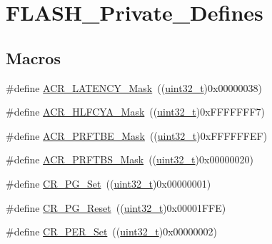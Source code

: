 \hypertarget{group___f_l_a_s_h___private___defines}{}\section{F\+L\+A\+S\+H\+\_\+\+Private\+\_\+\+Defines}
\label{group___f_l_a_s_h___private___defines}
\subsection*{Macros}
\begin{DoxyCompactItemize}
\item 
\#define \hyperlink{group___f_l_a_s_h___private___defines_ga5f1112c5731f01b063fdf2461efbedf7}{A\+C\+R\+\_\+\+L\+A\+T\+E\+N\+C\+Y\+\_\+\+Mask}~((\hyperlink{_p_e___types_8h_a33594304e786b158f3fb30289278f5af}{uint32\+\_\+t})0x00000038)
\item 
\#define \hyperlink{group___f_l_a_s_h___private___defines_ga6b6f73163f3a90f5072b6b7dc9fb63b7}{A\+C\+R\+\_\+\+H\+L\+F\+C\+Y\+A\+\_\+\+Mask}~((\hyperlink{_p_e___types_8h_a33594304e786b158f3fb30289278f5af}{uint32\+\_\+t})0x\+F\+F\+F\+F\+F\+F\+F7)
\item 
\#define \hyperlink{group___f_l_a_s_h___private___defines_gaf95fa450690ce94c4f4357e4dd72791a}{A\+C\+R\+\_\+\+P\+R\+F\+T\+B\+E\+\_\+\+Mask}~((\hyperlink{_p_e___types_8h_a33594304e786b158f3fb30289278f5af}{uint32\+\_\+t})0x\+F\+F\+F\+F\+F\+F\+E\+F)
\item 
\#define \hyperlink{group___f_l_a_s_h___private___defines_ga257768fe5d61ac49f43b6b90ba413102}{A\+C\+R\+\_\+\+P\+R\+F\+T\+B\+S\+\_\+\+Mask}~((\hyperlink{_p_e___types_8h_a33594304e786b158f3fb30289278f5af}{uint32\+\_\+t})0x00000020)
\item 
\#define \hyperlink{group___f_l_a_s_h___private___defines_gaf4fdb45c4a4d30dcddc389ec920f720f}{C\+R\+\_\+\+P\+G\+\_\+\+Set}~((\hyperlink{_p_e___types_8h_a33594304e786b158f3fb30289278f5af}{uint32\+\_\+t})0x00000001)
\item 
\#define \hyperlink{group___f_l_a_s_h___private___defines_gadda1a996e1867e911aaa7b0f30eb6834}{C\+R\+\_\+\+P\+G\+\_\+\+Reset}~((\hyperlink{_p_e___types_8h_a33594304e786b158f3fb30289278f5af}{uint32\+\_\+t})0x00001\+F\+F\+E)
\item 
\#define \hyperlink{group___f_l_a_s_h___private___defines_ga6e5e45c62f559102546b40de50c700bd}{C\+R\+\_\+\+P\+E\+R\+\_\+\+Set}~((\hyperlink{_p_e___types_8h_a33594304e786b158f3fb30289278f5af}{uint32\+\_\+t})0x00000002)
\item 

\end{DoxyCompactItemize}
